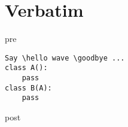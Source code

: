 
\section{Verbatim}
pre
\begin{verbatim}
Say \hello wave \goodbye ...
class A():
	pass
class B(A):
	pass
\end{verbatim}
post


